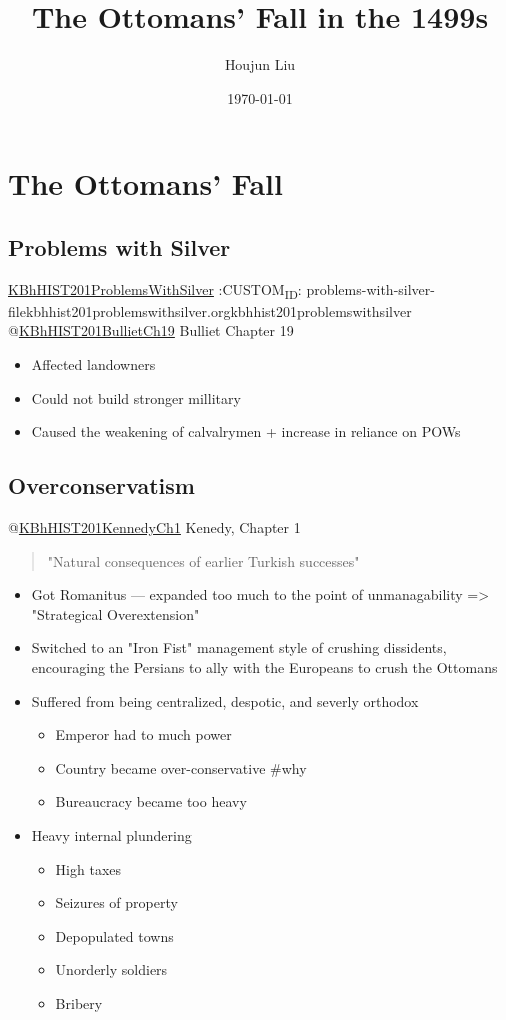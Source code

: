 \documentclass[letterpaper]{article}
\author{Houjun Liu}
\date{\today}
\title{The Ottomans' Fall in the 1499s}
\renewcommand{\tableofcontents}{}
\begin{document}
\tableofcontents



\section{The Ottomans' Fall}
\label{sec:org8b6de24}
\subsection{Problems with Silver}
\label{sec:orge75a3bc}
\href{KBhHIST201ProblemsWithSilver.org}{KBhHIST201ProblemsWithSilver}
:CUSTOM\textsubscript{ID}: problems-with-silver-filekbhhist201problemswithsilver.orgkbhhist201problemswithsilver
@\href{KBhHIST201BullietCh19.org}{KBhHIST201BullietCh19} Bulliet
Chapter 19

\begin{itemize}
\item Affected landowners
\item Could not build stronger millitary
\item Caused the weakening of calvalrymen + increase in reliance on POWs
\end{itemize}

\subsection{Overconservatism}
\label{sec:org8aa80be}
@\href{KBhHIST201KennedyCh1.org}{KBhHIST201KennedyCh1} Kenedy, Chapter
1

\begin{quote}
"Natural consequences of earlier Turkish successes"
\end{quote}

\begin{itemize}
\item Got Romanitus --- expanded too much to the point of unmanagability =>
"Strategical Overextension"
\item Switched to an "Iron Fist" management style of crushing dissidents,
encouraging the Persians to ally with the Europeans to crush the
Ottomans
\item Suffered from being centralized, despotic, and severly orthodox

\begin{itemize}
\item Emperor had to much power
\item Country became over-conservative \#why
\item Bureaucracy became too heavy
\end{itemize}

\item Heavy internal plundering

\begin{itemize}
\item High taxes
\item Seizures of property
\item Depopulated towns
\item Unorderly soldiers
\item Bribery
\end{itemize}
\end{itemize}
\end{document}
